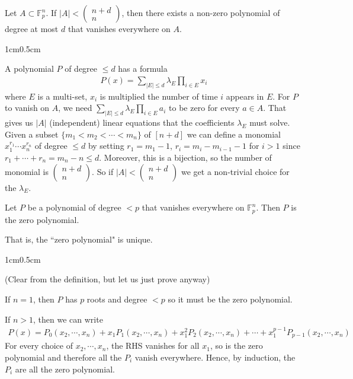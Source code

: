 \documentclass[12pt,a4paper]{report}
\newenvironment{proof}
{\begin{changemargin}{1cm}{0.5cm}
	}%
	{\end{changemargin}
}
\begin{document}
 Let $A \subset \mathbb{F}_p^n$. If $|A| < \begin{pmatrix}
n+d \\
n
\end{pmatrix}$, then there exists a non-zero polynomial of degree at most $d$ that vanishes everywhere on $A$.
\begin{proof}
\pf A polynomial $P$ of degree $\leq d$ has a formula
\begin{align*}
P(x) = \sum_{|E|\leq d} \lambda_E \prod_{i\in E} x_i
\end{align*}
where $E$ is a multi-set, $x_i$ is multiplied the number of time $i$ appears in $E$. For $P$ to vanish on $A$, we need $\sum_{|E| \leq d} \lambda_E \prod_{i\in E} a_i$ to be zero for every $a\in A$. That gives us $|A|$ (independent) linear equations that the coefficients $\lambda_E$ must solve. Given a subset $\{m_1 < m_2 < \cdots <m_n \}$ of $[n+d]$ we can define a monomial $x_1^{r_1} \cdots x_n^{r_n}$ of degree $\leq d$ by setting $r_1 = m_1 -1$, $r_i = m_i - m_{i-1} -1$ for $i>1$ since $r_1 + \cdots + r_n = m_n -n \leq d$. Moreover, this is a bijection, so the number of monomial is $\begin{pmatrix}
n+d \\
n
\end{pmatrix}$. So if $|A| < \begin{pmatrix}
n+d \\
n
\end{pmatrix}$ we get a non-trivial choice for the $\lambda_E$.

\eop
\end{proof}
\s

 Let $P$ be a polynomial of degree $<p$ that vanishes everywhere on $\mathbb{F}_p^n$. Then $P$ is the zero polynomial.

\quad That is, the ``zero polynomial" is unique.
\begin{proof}
\pf (Clear from the definition, but let us just prove anyway)

\quad If $n=1$, then $P$ has $p$ roots and degree $<p$ so it must be the zero polynomial.

\quad If $n>1$, then we can write 
\begin{align*}
P(x) = P_0(x_2, \cdots, x_n) + x_1 P_1(x_2, \cdots, x_n) + x_1^2 P_2(x_2, \cdots, x_n) + \cdots + x_1^{p-1} P_{p-1}(x_2, \cdots, x_n)
\end{align*}
For every choice of $x_2, \cdots, x_n$, the RHS vanishes for all $x_1$, so is the zero polynomial and therefore all the $P_i$ vanish everywhere. Hence, by induction, the $P_i$ are all the zero polynomial.

\eop
\end{proof}
\s
\end{document}
